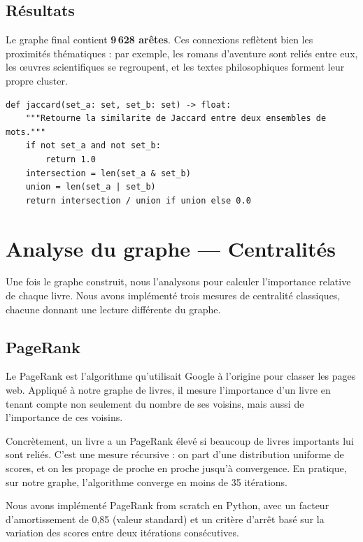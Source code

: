\documentclass[12pt,a4paper]{article}
\begin{document}
\subsection{Résultats}

Le graphe final contient \textbf{9\,628 arêtes}. Ces connexions reflètent
bien les proximités thématiques : par exemple, les romans d'aventure sont
reliés entre eux, les œuvres scientifiques se regroupent, et les textes
philosophiques forment leur propre cluster.

\begin{lstlisting}[style=python, caption={Calcul de la similarité de Jaccard.}, label=lst:jaccard]
def jaccard(set_a: set, set_b: set) -> float:
    """Retourne la similarite de Jaccard entre deux ensembles de mots."""
    if not set_a and not set_b:
        return 1.0
    intersection = len(set_a & set_b)
    union = len(set_a | set_b)
    return intersection / union if union else 0.0
\end{lstlisting}

\section{Analyse du graphe — Centralités}

Une fois le graphe construit, nous l'analysons pour calculer l'importance
relative de chaque livre. Nous avons implémenté trois mesures de centralité
classiques, chacune donnant une lecture différente du graphe.

\subsection{PageRank}

Le PageRank est l'algorithme qu'utilisait Google à l'origine pour classer
les pages web. Appliqué à notre graphe de livres, il mesure l'importance
d'un livre en tenant compte non seulement du nombre de ses voisins, mais
aussi de l'importance de ces voisins.

Concrètement, un livre a un PageRank élevé si beaucoup de livres importants
lui sont reliés. C'est une mesure récursive : on part d'une distribution
uniforme de scores, et on les propage de proche en proche jusqu'à convergence.
En pratique, sur notre graphe, l'algorithme converge en moins de 35 itérations.

Nous avons implémenté PageRank from scratch en Python, avec un facteur
d'amortissement de 0,85 (valeur standard) et un critère d'arrêt basé sur
la variation des scores entre deux itérations consécutives.
\end{document}
